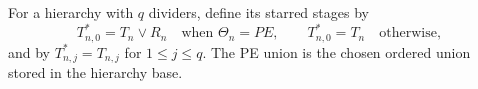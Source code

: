 \begin{definition}
For a hierarchy with $q$ dividers, define its starred stages by
\[
 T_{n,0}^{*}=T_n\vee R_n\quad\text{when }\Theta_n=PE,
 \qquad T_{n,0}^{*}=T_n\quad\text{otherwise},
\]
and by $T_{n,j}^{*}=T_{n,j}$ for $1\leq j\leq q$.  The PE union is the
chosen ordered union stored in the hierarchy base.
\end{definition}
